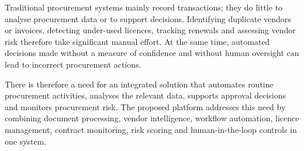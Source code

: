 Traditional procurement systems mainly record transactions; they do little to analyse procurement data or to support decisions. Identifying duplicate vendors or invoices, detecting under-used licences, tracking renewals and assessing vendor risk therefore take significant manual effort. At the same time, automated decisions made without a measure of confidence and without human oversight can lead to incorrect procurement actions.

There is therefore a need for an integrated solution that automates routine procurement activities, analyses the relevant data, supports approval decisions and monitors procurement risk. The proposed platform addresses this need by combining document processing, vendor intelligence, workflow automation, licence management, contract monitoring, risk scoring and human-in-the-loop controls in one system.


